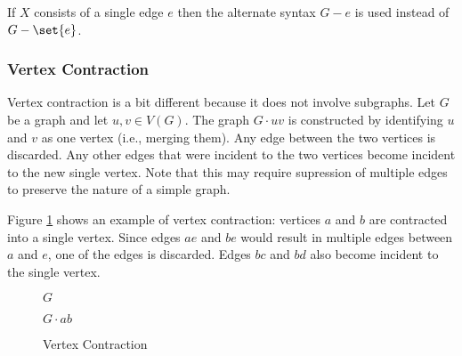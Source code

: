 If \(X\) consists of a single edge \(e\) then the alternate syntax \(G-e\) is used instead of \(G-\set{e}\).

\subsubsection{Vertex Contraction}

Vertex contraction is a bit different because it does not involve subgraphs.  Let \(G\) be a graph and let \(u,v\in
V(G)\).  The graph \(G\cdot uv\) is constructed by identifying \(u\) and \(v\) as one vertex (i.e., merging them).
Any edge between the two vertices is discarded.  Any other edges that were incident to the two vertices become
incident to the new single vertex.  Note that this may require supression of multiple edges to preserve the nature
of a simple graph.

Figure \ref{fig:contract} shows an example of vertex contraction: vertices \(a\) and \(b\) are contracted into a
single vertex.  Since edges \(ae\) and \(be\) would result in multiple edges between \(a\) and \(e\), one of the
edges is discarded.  Edges \(bc\) and \(bd\) also become incident to the single vertex.

\begin{figure}[h]
  \label{fig:contract}
  \begin{minipage}{3in}
    \begin{center}

      \bigskip

      \(G\)
    \end{center}
  \end{minipage}
  \begin{minipage}{3in}
    \begin{center} 

      \bigskip

      \(G\cdot ab\)
    \end{center}
  \end{minipage}
  \caption{Vertex Contraction}
\end{figure}

